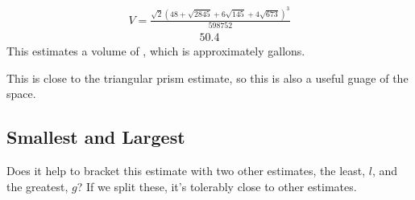 \documentclass[letterpaper,10pt,english]{sphinxmanual}
\begin{document}
\begin{sphinxVerbatim}[commandchars=\\\{\}]
  
 
\end{sphinxVerbatim}
\begin{equation*}
\begin{split}\displaystyle V = \frac{\sqrt{2} \left(48 + \sqrt{2845} + 6 \sqrt{145} + 4 \sqrt{673}\right)^{3}}{598752}\end{split}
\end{equation*}\begin{equation*}
\begin{split}\displaystyle 50.4\end{split}
\end{equation*}
\sphinxAtStartPar
This estimates a volume of , which is approximately  gallons.

\sphinxAtStartPar
This is close to the triangular prism estimate, so this is also a useful guage of the space.


\subsection{Smallest and Largest}
\label{\detokenize{tetrahedron:smallest-and-largest}}
\sphinxAtStartPar
Does it help to bracket this estimate with two other estimates, the least, \(l\), and the greatest, \(g\)? If we split these, it’s tolerably close to other estimates.

\begin{sphinxVerbatim}[commandchars=\\\{\}]
  \PYG{p}{[}     \PYG{p}{]}
  \PYG{p}{[}     \PYG{p}{]}
        
        
\end{sphinxVerbatim}
\end{document}

